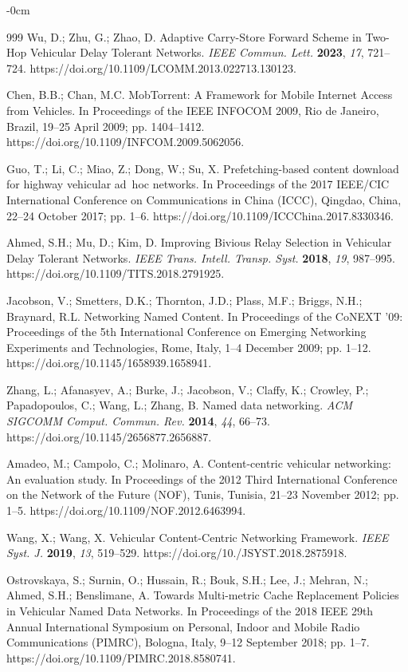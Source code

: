 \documentclass[sensors,aricle,accept,pdftex,moreauthors]{Definitions/mdpi}
\begin{document}
{\begin{adjustwidth}{-\extralength}{0cm}
\begin{thebibliography}{999}
 Wu, D.; Zhu, G.; Zhao, D. Adaptive Carry-Store Forward Scheme in Two-Hop Vehicular Delay Tolerant Networks. {\em IEEE Commun. Lett.} {\bf 2023}, {\em 17}, 721--724. https://doi.org/10.1109/LCOMM.2013.022713.130123.

 Chen, B.B.; Chan, M.C. MobTorrent: A Framework for Mobile Internet Access from Vehicles. In Proceedings of the IEEE INFOCOM 2009, Rio de Janeiro, Brazil, 19--25 April 2009; pp. 1404--1412. https://doi.org/10.1109/INFCOM.2009.5062056.

 Guo, T.; Li, C.; Miao, Z.; Dong, W.; Su, X. Prefetching-based content download for highway vehicular ad~hoc networks. In Proceedings of the 2017 IEEE/CIC International Conference on Communications in China (ICCC), Qingdao, China, 22--24 October 2017; pp. 1--6. https://doi.org/10.1109/ICCChina.2017.8330346.
 
 Ahmed, S.H.; Mu, D.; Kim, D. Improving Bivious Relay Selection in Vehicular Delay Tolerant Networks. {\em IEEE Trans. Intell. Transp. Syst.} {\bf 2018}, {\em 19}, 987--995. https://doi.org/10.1109/TITS.2018.2791925.
 
 Jacobson, V.; Smetters, D.K.; Thornton, J.D.; Plass, M.F.; Briggs, N.H.; Braynard, R.L. Networking Named Content. In Proceedings of the CoNEXT '09: Proceedings of the 5th International Conference on Emerging Networking Experiments and Technologies, Rome, Italy, 1--4 December 2009; pp. 1--12. https://doi.org/10.1145/1658939.1658941.

 Zhang, L.; Afanasyev, A.; Burke, J.; Jacobson, V.; Claffy, K.; Crowley, P.; Papadopoulos, C.; Wang, L.; Zhang, B. Named data networking. {\em ACM SIGCOMM Comput. Commun. Rev.} {\bf 2014}, {\em 44}, 66--73. https://doi.org/10.1145/2656877.2656887.

 Amadeo, M.; Campolo, C.; Molinaro, A. Content-centric vehicular networking: An evaluation study. In Proceedings of the 2012 Third International Conference on the Network of the Future (NOF), Tunis, Tunisia, 21--23 November 2012; pp. 1--5. https://doi.org/10.1109/NOF.2012.6463994.

 Wang, X.; Wang, X. Vehicular Content-Centric Networking Framework. {\em IEEE Syst. J.} {\bf 2019}, {\em 13}, 519--529. https://doi.org/10./JSYST.2018.2875918.

Ostrovskaya, S.; Surnin, O.; Hussain, R.; Bouk, S.H.; Lee, J.; Mehran, N.; Ahmed, S.H.; Benslimane, A. Towards Multi-metric Cache Replacement Policies in Vehicular Named Data Networks. In Proceedings of the 2018 IEEE 29th Annual International Symposium on Personal, Indoor and Mobile Radio Communications (PIMRC), Bologna, Italy, 9--12 September 2018; pp. 1--7. https://doi.org/10.1109/PIMRC.2018.8580741.


\end{thebibliography}
\end{adjustwidth}}
\end{document}
